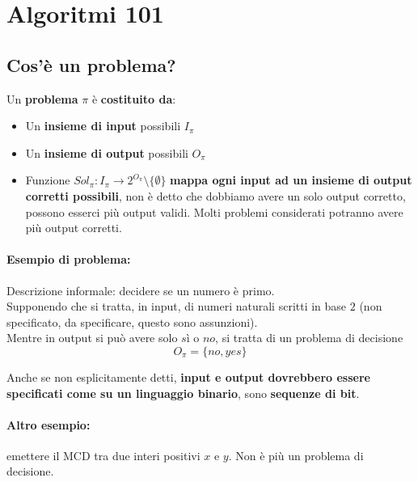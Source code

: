 
\section{Algoritmi 101}

\subsection{Cos'è un problema?} 

Un \textbf{problema} $\pi$ è \textbf{costituito da}:
\begin{itemize}
	\item Un \textbf{insieme di input} possibili $I_\pi$
	
	\item Un \textbf{insieme di output} possibili $O_\pi$
	
	\item Funzione $Sol_\pi: I_\pi \rightarrow 2^{O_\pi} \setminus \{\emptyset\}$ \textbf{mappa ogni input ad un insieme di output corretti possibili}, non è detto che dobbiamo avere un solo output corretto, possono esserci più output validi. Molti problemi considerati potranno avere più output corretti.
\end{itemize}

\paragraph{Esempio di problema:} Descrizione informale: decidere se un numero è primo. \\

Supponendo che si tratta, in input, di numeri naturali scritti in base $2$ (non specificato, da specificare, questo sono assunzioni).\\
Mentre in output si può avere solo $sì$ o $no$, si tratta di un problema di decisione
$$ O_\pi = \{no, yes\} $$

Anche se non esplicitamente detti, \textbf{input e output dovrebbero essere specificati come su un linguaggio binario}, sono \textbf{sequenze di bit}.\\

\newpage

\paragraph{Altro esempio:} emettere il MCD tra due interi positivi $x$ e $y$. Non è più un problema di decisione.\\

